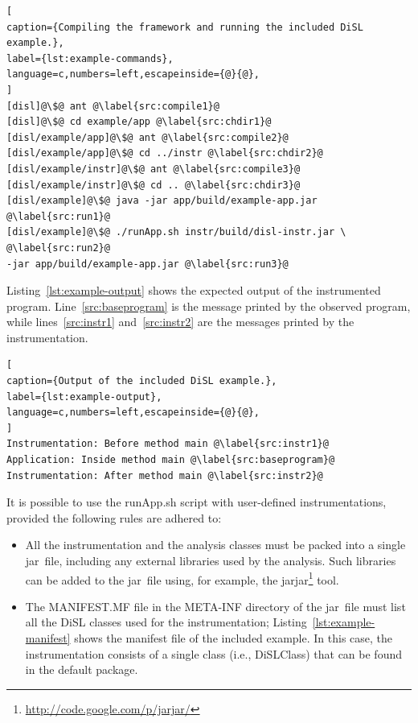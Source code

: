 \documentclass{article}
\newcommand{\brcode}[1]{\textsf{#1}}
\newcommand{\code}[1]{\mbox{\brcode{#1}}}
\begin{document}
\begin{lstlisting}[
caption={Compiling the framework and running the included DiSL example.},
label={lst:example-commands},
language=c,numbers=left,escapeinside={@}{@},
]
[disl]@\$@ ant @\label{src:compile1}@
[disl]@\$@ cd example/app @\label{src:chdir1}@
[disl/example/app]@\$@ ant @\label{src:compile2}@
[disl/example/app]@\$@ cd ../instr @\label{src:chdir2}@
[disl/example/instr]@\$@ ant @\label{src:compile3}@
[disl/example/instr]@\$@ cd .. @\label{src:chdir3}@
[disl/example]@\$@ java -jar app/build/example-app.jar @\label{src:run1}@
[disl/example]@\$@ ./runApp.sh instr/build/disl-instr.jar \ @\label{src:run2}@
-jar app/build/example-app.jar @\label{src:run3}@
\end{lstlisting}


\medskip
Listing~\ref{lst:example-output} shows the expected output of the instrumented program.
Line~\ref{src:baseprogram} is the message printed by the observed program, while lines~\ref{src:instr1} and~\ref{src:instr2} are the messages printed by the instrumentation.

\begin{lstlisting}[
caption={Output of the included DiSL example.},
label={lst:example-output},
language=c,numbers=left,escapeinside={@}{@},
]
Instrumentation: Before method main @\label{src:instr1}@
Application: Inside method main @\label{src:baseprogram}@
Instrumentation: After method main @\label{src:instr2}@
\end{lstlisting}


\medskip
It is possible to use the \code{runApp.sh} script with user-defined instrumentations, provided the following rules are adhered to:
\begin{itemize}
\item All the instrumentation and the analysis classes must be packed into a single jar~file, including any external libraries used by the analysis.
Such libraries can be added to the jar~file using, for example, the \code{jarjar}\footnote{\url{http://code.google.com/p/jarjar/}} tool.

\item The \code{MANIFEST.MF} file in the \code{META-INF} directory of the jar~file must list all the DiSL classes used for the instrumentation; Listing~\ref{lst:example-manifest} shows the manifest file of the included example.
In this case, the instrumentation consists of a single class (i.e., \code{DiSLClass}) that can be found in the default package.
\end{itemize}
\end{document}
